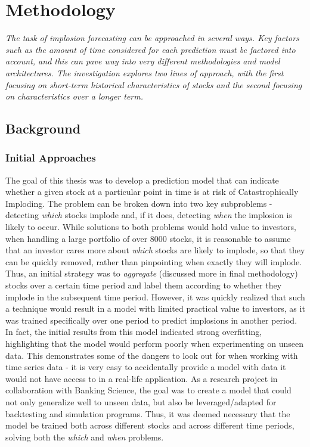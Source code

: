 \documentclass[a4paper]{report}
\begin{document}
\chapter{Methodology}
\textit{The task of implosion forecasting can be approached in several ways. Key factors such as the amount of time considered for each prediction must be factored into account, and this can pave way into very 
different methodologies and model architectures. The investigation explores two lines of approach, with the first focusing on short-term historical characteristics of stocks 
and the second focusing on characteristics over a longer term.}


\section{Background}

\subsection{Initial Approaches}
The goal of this thesis was to develop a prediction model that can indicate whether a given stock at a particular point in time is at risk of Catastrophically Imploding. The problem can 
be broken down into two key subproblems - detecting \textit{which} stocks implode and, if it does, detecting \textit{when} the implosion is likely to occur. While solutions to both 
problems would hold value to investors, when handling a large portfolio of over 8000 stocks, it is reasonable to assume that an investor cares more about \textit{which} stocks are 
likely to implode, so that they can be quickly removed, rather than pinpointing when exactly they will implode. Thus, an initial strategy was to \textit{aggregate} (discussed more in final methodology) stocks over a certain time period 
and label them according to whether they implode in the subsequent time period. However, it was quickly realized that such a technique would result in a model with limited practical value to investors, as it was trained
specifically over one period to predict implosions in another period. In fact, the initial results from this model indicated strong overfitting, highlighting that the model would perform poorly when 
experimenting on unseen data. This demonstrates some of the dangers to look out for when working with time series data - it is very easy to accidentally provide a model with data it would not have access
to in a real-life application. As a research project in collaboration with Banking Science, the goal was to create a model that could not only generalize well to unseen data, but also be leveraged/adapted for backtesting 
and simulation programs. Thus, it was deemed necessary that the model be trained both across different stocks and across different time periods, solving both the \textit{which} and \textit{when} problems.
\end{document}
